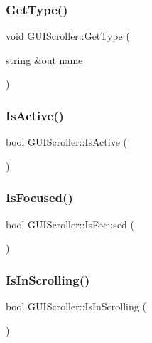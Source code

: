 \subsubsection{\texorpdfstring{Get\+Type()}{GetType()}}
{\footnotesize\ttfamily void G\+U\+I\+Scroller\+::\+Get\+Type (\begin{DoxyParamCaption}\item[{string \&out}]{name }\end{DoxyParamCaption})}

\hypertarget{class_g_u_i_scroller_a7c57d7d1f5b2e15ac6c242a53a3425b0}{}\label{class_g_u_i_scroller_a7c57d7d1f5b2e15ac6c242a53a3425b0} 
\subsubsection{\texorpdfstring{Is\+Active()}{IsActive()}}
{\footnotesize\ttfamily bool G\+U\+I\+Scroller\+::\+Is\+Active (\begin{DoxyParamCaption}{ }\end{DoxyParamCaption})}

\hypertarget{class_g_u_i_scroller_a90456ec21d36e48ca5f640530afb2ece}{}\label{class_g_u_i_scroller_a90456ec21d36e48ca5f640530afb2ece} 
\subsubsection{\texorpdfstring{Is\+Focused()}{IsFocused()}}
{\footnotesize\ttfamily bool G\+U\+I\+Scroller\+::\+Is\+Focused (\begin{DoxyParamCaption}{ }\end{DoxyParamCaption})}

\hypertarget{class_g_u_i_scroller_ac3d346b2822a88a08f8a0644289214ac}{}\label{class_g_u_i_scroller_ac3d346b2822a88a08f8a0644289214ac} 
\subsubsection{\texorpdfstring{Is\+In\+Scrolling()}{IsInScrolling()}}
{\footnotesize\ttfamily bool G\+U\+I\+Scroller\+::\+Is\+In\+Scrolling (\begin{DoxyParamCaption}{ }\end{DoxyParamCaption})}

